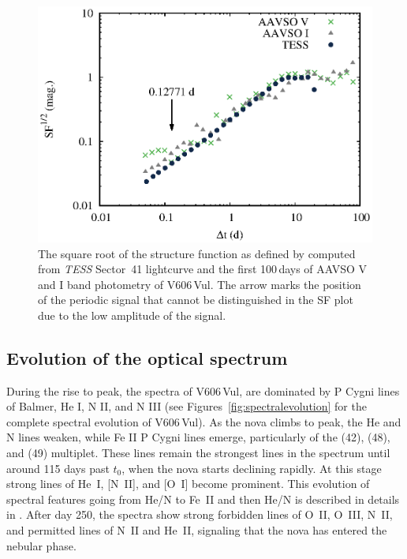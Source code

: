 \documentclass[twocolumn]{aastex631}
\newcommand{\nova}{V606\,Vul}
\begin{document}
\begin{figure}
        \includegraphics[width=1.0\linewidth,clip=true,trim=0.0cm 0cm 0cm 0cm,angle=0]{SF.eps}
\caption{The square root of the structure function as defined by \citet{1992ApJ...396..469H} 
computed from {\em TESS} Sector~41 lightcurve and the first 100\,days of AAVSO V and I band photometry of \nova{}.
The arrow marks the position of the periodic signal that cannot be
distinguished in the SF plot due to the low amplitude of the signal.}
    \label{fig:sf}
\end{figure}


\subsection{Evolution of the optical spectrum}
During the rise to peak, the spectra of \nova{}, are dominated by P Cygni lines of Balmer, He I, N II, and N III (see Figures~\ref{fig:spectralevolution} for the complete spectral evolution of \nova{}). As the nova climbs to peak, the He and N lines weaken, while Fe II P Cygni lines emerge, particularly of the (42), (48), and (49) multiplet. These lines remain the strongest lines in the spectrum until around 115 days past $t_0$, when the nova starts declining rapidly. 
At this stage strong lines of He~I, [N~II], and [O~I] become prominent. 
This evolution of spectral features going from He/N to Fe~II and then He/N is described in details in \citet{2023arXiv230907097A}. 
After day 250, the spectra show strong forbidden lines of O~II, O~III, N~II, and permitted lines of
N~II and He~II, signaling that the nova has entered the nebular phase. 
\end{document}
